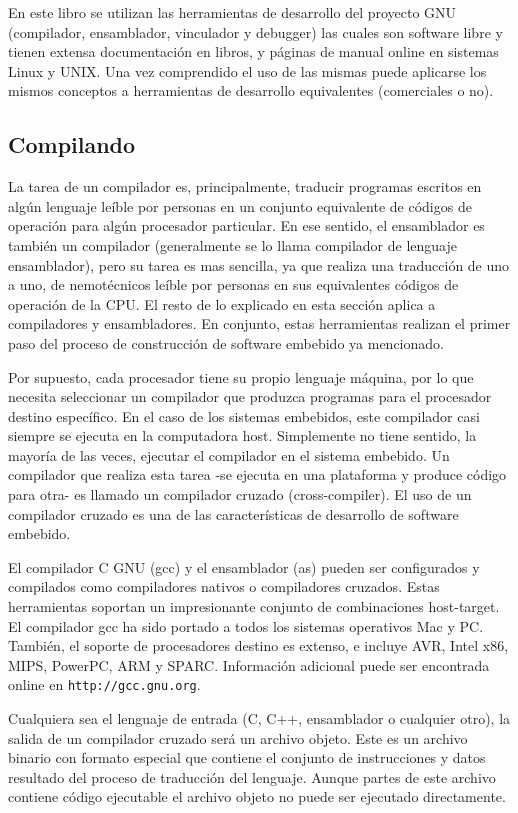 \documentclass[12pt]{article}
\begin{document}
En este libro se utilizan las herramientas de desarrollo del proyecto GNU
(compilador, ensamblador, vinculador y debugger) las cuales son software libre
y tienen extensa documentación en libros, y páginas de manual online en sistemas
Linux y UNIX. Una vez comprendido
el uso de las mismas puede aplicarse los mismos conceptos a herramientas
de desarrollo equivalentes (comerciales o no).

\subsection *{Compilando}

La tarea de un compilador es, principalmente, traducir programas escritos en 
algún lenguaje leíble por personas en un conjunto equivalente
de códigos de operación para algún procesador particular. En ese sentido,
el ensamblador es también un compilador (generalmente se lo llama
compilador de lenguaje ensamblador), pero su tarea es mas sencilla, ya que
realiza una traducción de uno a uno, de nemotécnicos leíble por personas
en sus equivalentes códigos de operación de la CPU. El resto de lo explicado en esta sección
aplica a compiladores y ensambladores. En conjunto, estas herramientas
realizan el primer paso del proceso de construcción de software embebido
ya mencionado.

Por supuesto, cada procesador tiene su propio lenguaje máquina, por lo que
necesita seleccionar un compilador que produzca programas para el procesador
destino específico. En el caso de los sistemas embebidos,  este compilador
casi siempre se ejecuta en la computadora host. Simplemente no tiene sentido,
la mayoría de las veces, ejecutar el compilador en el sistema embebido.
Un compilador que realiza esta tarea -se ejecuta en una plataforma  y produce
código para otra- es llamado un compilador cruzado (cross-compiler). El uso de
un compilador cruzado es una de las características de desarrollo de software
embebido.

El compilador C GNU (gcc) y el ensamblador (as) pueden ser configurados y compilados
como compiladores nativos o compiladores cruzados. Estas herramientas soportan
un impresionante conjunto de combinaciones host-target. El compilador gcc ha sido
portado a todos los sistemas operativos Mac y PC. También, el soporte de procesadores destino
es extenso, e incluye AVR, Intel x86, MIPS, PowerPC, ARM y SPARC. Información
adicional puede ser encontrada online en {\tt http://gcc.gnu.org}.

Cualquiera sea el lenguaje de entrada (C, C++, ensamblador o cualquier otro), la salida
de un compilador cruzado será un archivo objeto. Este es un archivo binario con
formato especial que contiene el conjunto de instrucciones y datos
resultado del proceso de traducción del lenguaje. Aunque partes de este archivo
contiene código ejecutable el archivo objeto no puede ser ejecutado directamente.
\end{document}
